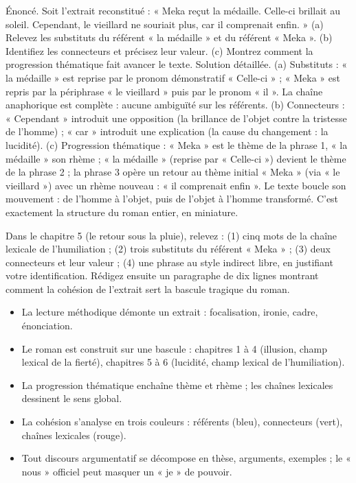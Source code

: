 \documentclass[11pt]{article}
\begin{document}
\begin{exoresolu}
Énoncé. Soit l'extrait reconstitué : « Meka reçut la médaille. Celle-ci brillait au soleil. Cependant, le vieillard ne souriait plus, car il comprenait enfin. » (a) Relevez les substituts du référent « la médaille » et du référent « Meka ». (b) Identifiez les connecteurs et précisez leur valeur. (c) Montrez comment la progression thématique fait avancer le texte.
\tcblower
Solution détaillée. (a) Substituts : « la médaille » est reprise par le pronom démonstratif « Celle-ci » ; « Meka » est repris par la périphrase « le vieillard » puis par le pronom « il ». La chaîne anaphorique est complète : aucune ambiguïté sur les référents. (b) Connecteurs : « Cependant » introduit une opposition (la brillance de l'objet contre la tristesse de l'homme) ; « car » introduit une explication (la cause du changement : la lucidité). (c) Progression thématique : « Meka » est le thème de la phrase 1, « la médaille » son rhème ; « la médaille » (reprise par « Celle-ci ») devient le thème de la phrase 2 ; la phrase 3 opère un retour au thème initial « Meka » (via « le vieillard ») avec un rhème nouveau : « il comprenait enfin ». Le texte boucle son mouvement : de l'homme à l'objet, puis de l'objet à l'homme transformé. C'est exactement la structure du roman entier, en miniature.
\end{exoresolu}

\begin{exercice}
Dans le chapitre 5 (le retour sous la pluie), relevez : (1) cinq mots de la chaîne lexicale de l'humiliation ; (2) trois substituts du référent « Meka » ; (3) deux connecteurs et leur valeur ; (4) une phrase au style indirect libre, en justifiant votre identification. Rédigez ensuite un paragraphe de dix lignes montrant comment la cohésion de l'extrait sert la bascule tragique du roman.
\end{exercice}

\begin{aretenir}
\begin{itemize}
\item La lecture méthodique démonte un extrait : focalisation, ironie, cadre, énonciation.
\item Le roman est construit sur une bascule : chapitres 1 à 4 (illusion, champ lexical de la fierté), chapitres 5 à 6 (lucidité, champ lexical de l'humiliation).
\item La progression thématique enchaîne thème et rhème ; les chaînes lexicales dessinent le sens global.
\item La cohésion s'analyse en trois couleurs : référents (bleu), connecteurs (vert), chaînes lexicales (rouge).
\item Tout discours argumentatif se décompose en thèse, arguments, exemples ; le « nous » officiel peut masquer un « je » de pouvoir.
\end{itemize}
\end{aretenir}
\end{document}
